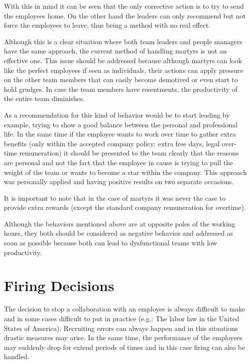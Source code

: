 With this in mind it can be seen that the only corrective action is to try to send the employees home. On the other hand the leaders can only recommend but not force the employees to leave, thus being a method with no real effect. 

Although this is a clear situation where both team leaders and people managers have the same approach, the current method of handling martyrs is not an effective one. This issue should be addressed because although martyrs can look like the perfect employees if seen as individuals, their actions can apply pressure on the other team members that can easily become demotived or even start to hold grudges. In case the team members have resentments, the productivity of the entire team diminishes. 

As a recommendation for this kind of behavior would be to start leading by example, trying to show a good balance between the personal and professional life. In the same time if the employee wants to work over time to gather extra benefits (only within the accepted company policy: extra free days, legal over-time remuneration) it should be presented to the team clearly that the reasons are personal and not the fact that the employee in cause is trying to pull the weight of the team or wants to become a star within the company. This approach was personally applied and having positive results on two separate occasions.

It is important to note that in the case of martyrs it was never the case to provide extra rewards (except the standard company remuneration for overtime).

Although the behaviors mentioned above are at opposite poles of the working hours, they both should be considered as negative behavior and addressed as soon as possible because both can lead to dysfunctional teams with low productivity.

\section{Firing Decisions}
\label{sec:firing}
The decision to stop a collaboration with an employee is always difficult to make and in some cases difficult to put in practice (e.g.: The labor law in the United States of America). Recruiting errors can always happen and in this situations drastic measures may arise. In the same time, the performance of the employees may suddenly drop for extend periods of times and in this case firing can also be handled. 

